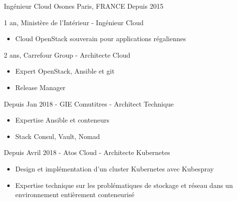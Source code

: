 

\begin{cventries}

  \cventry
    {Ingénieur Cloud} %
    {Osones} %
    {Paris, FRANCE} %
    {Depuis 2015} %
    {
      \begin{cvitems} %
      \item {1 an, Ministère de l'Intérieur - Ingénieur Cloud}
          \begin{itemize}
            \item {Cloud OpenStack souverain pour applications régaliennes}
          \end{itemize}

        \item {2 ans, Carrefour Group - Architecte Cloud}
          \begin{itemize}
            \item {Expert OpenStack, Ansible et git}
            \item {Release Manager}
          \end{itemize}

        \item {Depuis Jan 2018 - GIE Comutitres - Architect Technique}
          \begin{itemize}
            \item {Expertise Ansible et conteneurs}
            \item {Stack Consul, Vault, Nomad}
          \end{itemize}

        \item {Depuis Avril 2018 - Atos Cloud - Architecte Kubernetes}
        \begin{itemize}
          \item {Design et implémentation d'un cluster Kubernetes avec
            Kubespray}
          \item {Expertise technique sur les problématiques de stockage et
            réseau dans un environnement entièrement conteneurisé}
          \end{itemize}


\end{cvitems}}
\end{cventries}
